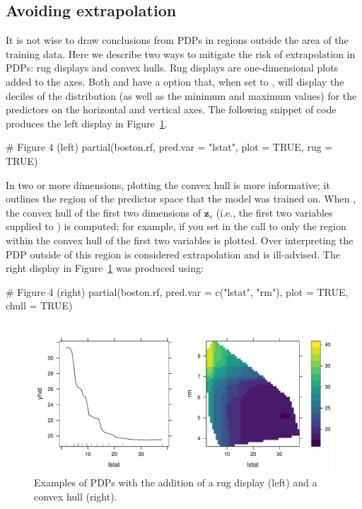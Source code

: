 \subsection{Avoiding extrapolation}
\label{sec:extrapolation}

It is not wise to draw conclusions from PDPs in regions outside the area of the training data. Here we describe two ways to mitigate the risk of extrapolation in PDPs: rug displays and convex hulls. Rug displays are one-dimensional plots added to the axes. Both  and  have a  option that, when set to , will display the deciles of the distribution (as well as the minimum and maximum values) for the predictors on the horizontal and vertical axes. The following snippet of code produces the left display in Figure~\ref{fig:partial_extrap}.
\begin{example}
# Figure 4 (left)
partial(boston.rf, pred.var = "lstat", plot = TRUE, rug = TRUE)
\end{example}

In two or more dimensions, plotting the convex hull is more informative; it outlines the region of the predictor space that the model was trained on. When , the convex hull of the first two dimensions of $\boldsymbol{z}_s$ (i.e., the first two variables supplied to ) is computed; for example, if you set  in the call to  only the region within the convex hull of the first two variables is plotted. Over interpreting the PDP outside of this region is considered extrapolation and is ill-advised. The right display in Figure~\ref{fig:partial_extrap} was produced using:
\begin{example}
# Figure 4 (right)
partial(boston.rf, pred.var = c("lstat", "rm"), plot = TRUE, chull = TRUE)
\end{example}

\begin{figure}[!htbp]
  \centering
  \includegraphics[width=1.0\linewidth]{partial_extrap}
  \caption{Examples of PDPs with the addition of a rug display (left) and a convex hull (right).}
  \label{fig:partial_extrap}
\end{figure}


